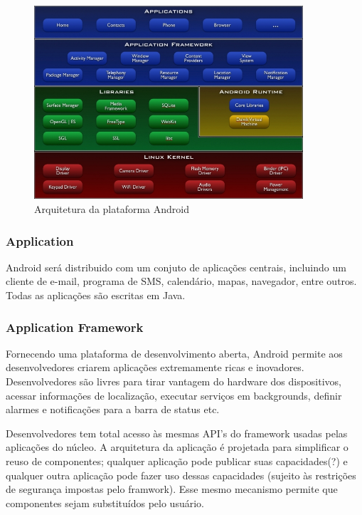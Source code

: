 \documentclass[a4paper,12pt]{report}
\begin{document}
\begin{figure}
    \includegraphics[width=10cm]{img/system-architecture.jpg}
    \caption{Arquitetura da plataforma Android}
    \label{system-architecture}
\end{figure}

\subsubsection{Application}
Android será distribuido com um conjuto de aplicações centrais, incluindo um cliente
de e-mail, programa de SMS, calendário, mapas, navegador, entre outros. Todas as 
aplicações são escritas em Java.

\subsubsection{Application Framework}
Fornecendo uma plataforma de desenvolvimento aberta, Android permite aos desenvolvedores
criarem aplicações extremamente ricas e inovadores. Desenvolvedores são livres para
tirar vantagem do hardware dos dispositivos, acessar informações de localização, 
executar serviços em backgrounds, definir alarmes e notificações para a barra de 
status etc.

Desenvolvedores tem total acesso às mesmas API's do framework usadas pelas aplicações 
do núcleo. A arquitetura da aplicação é projetada para simplificar o reuso de componentes;
qualquer aplicação pode publicar suas capacidades(?) e qualquer outra aplicação pode 
fazer uso dessas capacidades (sujeito às restrições de segurança impostas pelo 
framwork). Esse mesmo mecanismo permite que componentes sejam substituídos pelo 
usuário.
\end{document}
